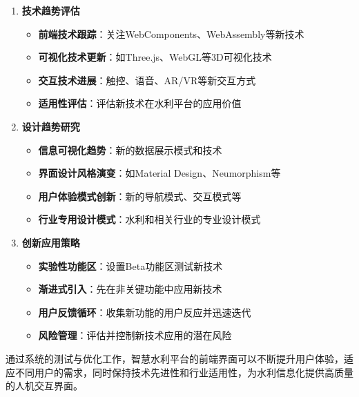 \begin{enumerate}
\def\labelenumi{\arabic{enumi}.}
\tightlist
\item
  \textbf{技术趋势评估}

  \begin{itemize}
  \tightlist
  \item
    \textbf{前端技术跟踪}：关注WebComponents、WebAssembly等新技术
  \item
    \textbf{可视化技术更新}：如Three.js、WebGL等3D可视化技术
  \item
    \textbf{交互技术进展}：触控、语音、AR/VR等新交互方式
  \item
    \textbf{适用性评估}：评估新技术在水利平台的应用价值
  \end{itemize}
\item
  \textbf{设计趋势研究}

  \begin{itemize}
  \tightlist
  \item
    \textbf{信息可视化趋势}：新的数据展示模式和技术
  \item
    \textbf{界面设计风格演变}：如Material Design、Neumorphism等
  \item
    \textbf{用户体验模式创新}：新的导航模式、交互模式等
  \item
    \textbf{行业专用设计模式}：水利和相关行业的专业设计模式
  \end{itemize}
\item
  \textbf{创新应用策略}

  \begin{itemize}
  \tightlist
  \item
    \textbf{实验性功能区}：设置Beta功能区测试新技术
  \item
    \textbf{渐进式引入}：先在非关键功能中应用新技术
  \item
    \textbf{用户反馈循环}：收集新功能的用户反应并迅速迭代
  \item
    \textbf{风险管理}：评估并控制新技术应用的潜在风险
  \end{itemize}
\end{enumerate}

通过系统的测试与优化工作，智慧水利平台的前端界面可以不断提升用户体验，适应不同用户的需求，同时保持技术先进性和行业适用性，为水利信息化提供高质量的人机交互界面。
